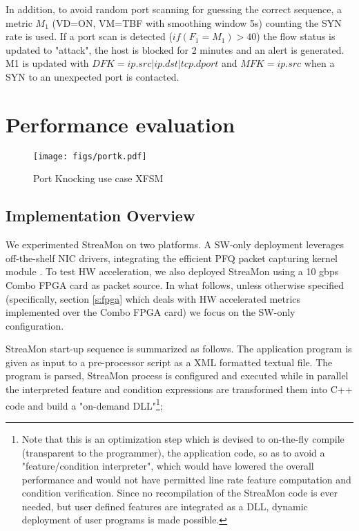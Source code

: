 \documentclass[conference,letterpaper]{sig-alternate-10pt}
\begin{document}
In addition, to avoid random port scanning for guessing the correct sequence, a metric $M_1$ (VD=ON, VM=TBF with smoothing window 5s) counting the SYN rate is used. If a port scan is detected ($if (F_1 = M_1) > 40$) the flow status is updated to "attack", the host is blocked for 2 minutes and an alert is generated. M1 is updated with $DFK =  ip.src|ip.dst|tcp.dport$ and $MFK = ip.src$ when a SYN to an unexpected port is contacted.



\section{Performance evaluation}




\begin{figure}[t]
	\centering
	\texttt{[image: figs/portk.pdf]}
	\vspace*{-.5cm}
	\caption{Port Knocking use case XFSM}
	\vspace*{-.5cm}
	\label{fig:portkn}
\end{figure}

\subsection{Implementation Overview}


We experimented StreaMon on two platforms. A SW-only deployment leverages off-the-shelf NIC drivers, integrating the efficient PFQ packet capturing kernel module \cite{pfq}. To test HW acceleration, we also deployed StreaMon using a 10 gbps Combo FPGA card as packet source. In what follows, unless otherwise specified (specifically, section \ref{s:fpga} which deals with HW accelerated metrics implemented over the Combo FPGA card) we focus on the SW-only configuration.

StreaMon start-up sequence is summarized as follows. The application program is given as input to a pre-processor script as a XML formatted textual file. The program is parsed, StreaMon process is configured and executed while in parallel the interpreted feature and condition expressions are transformed them into C++ code and build a "on-demand DLL"\footnote{
	Note that this is an optimization step which is devised to on-the-fly compile (transparent to the 
	programmer), the application code, so as to avoid a "feature/condition interpreter", which would 
	have lowered the overall performance and would not have permitted line rate feature computation 
	and condition verification. Since no recompilation of the StreaMon code is ever needed, but user 
	defined features are integrated as a DLL, dynamic deployment of user programs is made possible.
}; 
\end{document}
